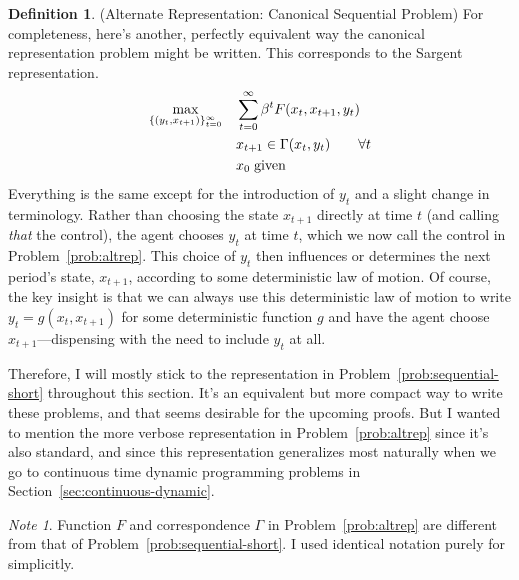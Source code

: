 \documentclass[12pt]{article}
\numberwithin{equation}{section} %
\theoremstyle{plain}
\theoremstyle{definition}
\newtheorem{defn}[thm]{Definition}
\theoremstyle{remark}
\newtheorem*{note}{Note}
\newcommand{\sumtinfz}{\sum^\infty_{t=0}}
\begin{document}
\begin{defn}{(Alternate Representation: Canonical Sequential Problem)}
\label{defn:sequential-altrep}
For completeness, here's another, perfectly equivalent way the canonical
representation problem might be written. This corresponds to the Sargent
representation.
\begin{align}
  \label{prob:altrep}
  \max_{\{(y_t,x_{t+1})\}_{t=0}^\infty}
  \quad &\sumtinfz \beta^t F(x_t,x_{t+1},y_t)\\
  &x_{t+1} \in \Gamma(x_t,y_t) \qquad \forall t\notag\\
  &x_0 \; \text{given}\notag
\end{align}
Everything is the same except for the introduction of $y_t$ and a slight
change in terminology. Rather than choosing the state $x_{t+1}$ directly
at time $t$ (and calling \emph{that} the control), the agent chooses
$y_t$ at time $t$, which we now call the control in
Problem~\ref{prob:altrep}.  This choice of $y_t$ then influences or
determines the next period's state, $x_{t+1}$, according to some
deterministic law of motion. Of course, the key insight is that we can
always use this deterministic law of motion to write $y_t =
g(x_t,x_{t+1})$ for some deterministic function $g$ and have the agent
choose $x_{t+1}$---dispensing with the need to include $y_t$ at all.

Therefore, I will mostly stick to the representation in
Problem~\ref{prob:sequential-short} throughout this section. It's an
equivalent but more compact way to write these problems, and that seems
desirable for the upcoming proofs.
But I wanted to mention the more verbose representation in
Problem~\ref{prob:altrep} since it's also standard, and since this
representation generalizes most naturally when we go to continuous time
dynamic programming problems in Section~\ref{sec:continuous-dynamic}.
\end{defn}
\begin{note}
Function $F$ and correspondence $\Gamma$ in Problem~\ref{prob:altrep}
are different from that of Problem~\ref{prob:sequential-short}.  I used
identical notation purely for simplicitly.
\end{note}

\end{document}
